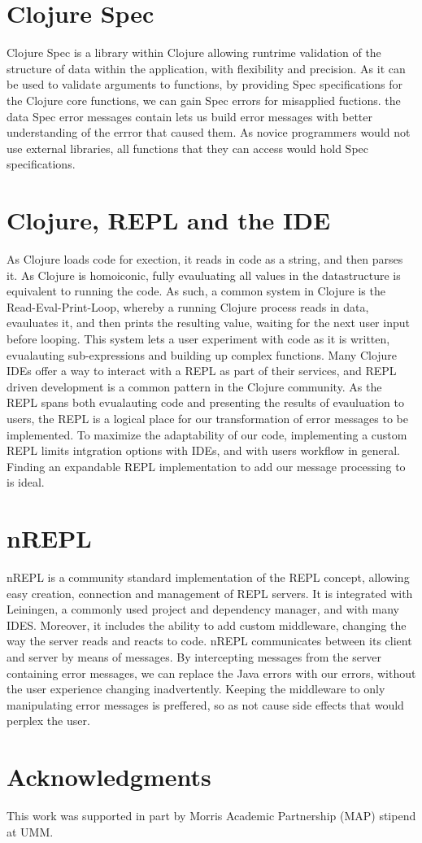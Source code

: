 \documentclass[12pt]{article}
\begin{document}
\section{Clojure Spec}
Clojure Spec is a library within Clojure allowing runtrime validation
of the structure of data within the application, with flexibility and precision.
As it can be used to validate arguments to functions, by providing Spec
 specifications for the Clojure core functions, we can gain Spec errors
 for misapplied fuctions. the data Spec error messages contain lets us build
 error messages with better understanding of the errror that caused them.
 As novice programmers would not use external libraries,
 all functions that they can access would hold Spec specifications.


\section{Clojure, REPL and the IDE}
As Clojure loads code for exection, it reads in code as a string,
and then parses it. As Clojure is homoiconic, fully evauluating all values in the datastructure
is equivalent to running the code.
As such, a common system in Clojure is the Read-Eval-Print-Loop, whereby a running Clojure
process reads in data, evauluates it, and then prints the resulting value,
 waiting for the next user input before looping.
This system lets a user experiment with code as it is written,
 evualauting sub-expressions and building up complex functions.
Many Clojure IDEs offer a way to interact with a REPL as part of their services,
 and REPL driven development is a common pattern in the Clojure community.
 As the REPL spans both evualauting code and presenting the results of evauluation to users,
 the REPL is a logical place for our transformation of error messages to be implemented.
 To maximize the adaptability of our code, implementing a custom REPL limits intgration
 options with IDEs, and with users workflow in general.
  Finding an expandable REPL implementation to add our message processing to
  is ideal.


\section{nREPL}
nREPL is a community standard implementation of the REPL concept,
allowing easy creation, connection and management of REPL servers.
It is integrated with Leiningen, a commonly used project and dependency manager,
 and with many IDES. Moreover, it includes the ability to add custom middleware,
  changing the way the server reads and reacts to code.
 nREPL communicates between its client and server by means of messages.
 By intercepting messages from the server containing error messages,
 we can replace the Java errors with our errors,
  without the user experience changing inadvertently.
  Keeping the middleware to only manipulating error messages
  is preffered, so as not cause side effects that would perplex the user.




\section{Acknowledgments}
This work was supported in part by Morris Academic Partnership (MAP) stipend at UMM.




\end{document}
